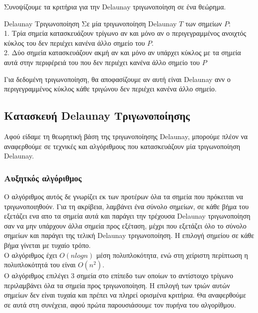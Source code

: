 \documentclass[oneside,12pt]{book}
\theoremstyle{definition}
\begin{document}
Συνοψίζουμε τα κριτήρια για την Delaunay τριγωνοποίηση σε ένα θεώρημα. \\

\begin{mytheorem}{Delaunay Τριγωνοποίηση}{}
	Σε μία τριγωνοποίηση Delaunay \(T\) των σημείων \(P\): \\
	1. Τρία σημεία κατασκευάζουν τρίγωνο αν και μόνο αν ο περιγεγραμμένος ανοιχτός κύκλος του δεν περιέχει κανένα άλλο σημείο του \(P\). \\
	2. Δύο σημεία κατασκευάζουν ακμή αν και μόνο αν υπάρχει κύκλος με τα σημεία αυτά στην περιφέρειά του που δεν περιέχει κανένα άλλο σημείο του \(P\)
\end{mytheorem}

Για δεδομένη τριγωνοποίηση, θα αποφασίζουμε αν αυτή είναι Delaunay ανν ο περιγεγραμμένος κύκλος κάθε τριγώνου δεν περιέχει κανένα άλλο σημείο. \\

\subsection{Κατασκευή Delaunay Τριγωνοποίησης}

Αφού είδαμε τη θεωρητική βάση της τριγωνοποίησης Delaunay, μπορούμε πλέον να αναφερθούμε σε τεχνικές και αλγόριθμους που κατασκευάζουν μία τριγωνοποίηση Delaunay. \\

\subsubsection{Αυξητκός αλγόριθμος}

Ο αλγόριθμος αυτός δε γνωρίζει εκ των προτέρων όλα τα σημεία που πρόκειται να τριγωνοποιηθούν. Για τη ακρίβεια, λαμβάνει ένα σύνολο σημείων, σε κάθε βήμα του εξετάζει ενα απο τα σημεία αυτά και παράγει την τρέχουσα Delaunay τριγωνοποίηση σαν να μην υπάρχουν άλλα σημεία προς εξέταση, μέχρι που εξετάζει όλο το σύνολο σημείων και παράγει της τελική Delaunay τριγωνοποίηση. Η επιλογή σημείου σε κάθε βήμα γίνεται με τυχαίο τρόπο. \\

Ο αλγόριθμος έχει \(Ο(n logn)\) μέση πολυπλοκότητα, ενώ στη χείριστη περίπτωση η πολυπλοκότητά του είναι \(O(n^2)\). \\

Ο αλγόριθμος επιλέγει 3 σημεία στο επίπεδο των οποίων το αντίστοιχο τρίγωνο περιλαμβάνει όλα τα σημεία προς τριγωνοποίηση. Η επιλογή των τριών αυτών σημείων δεν είναι τυχαία και πρέπει να πληρεί ορισμένα κριτήρια. Θα αναφερθούμε σε αυτά στη συνέχεια, αφού πρώτα παρουσιάσουμε τον πυρήνα του αλγορίθμου. \\
\end{document}
